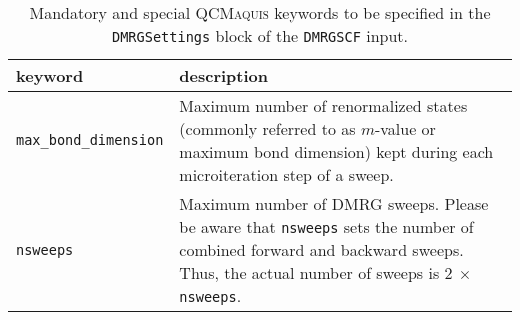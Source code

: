 \documentclass[bibliography=totoc,12pt,a4paper]{scrartcl}
\newcommand{\qcm}{\textsc{QCMaquis}}
\newcommand{\kwd}[1]{\texttt{#1}}
\begin{document}
\begin{table}[h]
 \caption{\label{tab:standard_kw}Mandatory and special \qcm{} keywords to be specified in the \kwd{DMRGSettings} block of the \kwd{DMRGSCF} input.}
\begin{tabular}{ll}
 \toprule
 keyword & description \\
 \midrule

 \multirow{3}{*}{\texttt{max\_bond\_dimension}} & \multirow{3}{11cm}{Maximum number of renormalized states
(commonly referred to as $m$-value or maximum bond dimension)
kept during each microiteration step of a sweep.}\\
& \\
& \\
\multirow{4}{*}{\texttt{nsweeps}} & \multirow{4}{11cm}{Maximum number of DMRG sweeps. Please be aware that \texttt{nsweeps} sets
the number of combined forward and backward sweeps. Thus, the actual number of sweeps is $2\ \times $ \texttt{nsweeps}.} \\
& \\
& \\
& \\
\bottomrule
\end{tabular}
\end{table}
\end{document}

